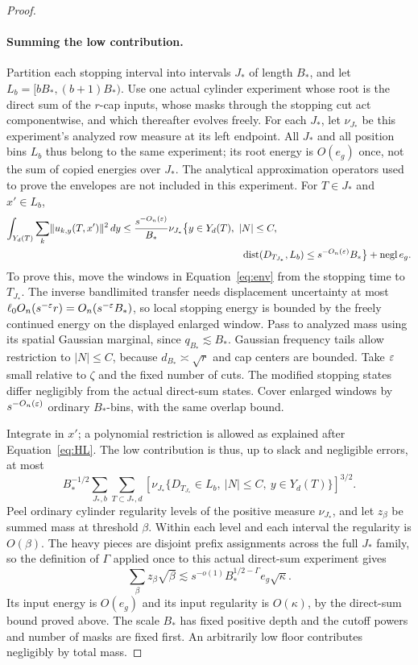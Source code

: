 \begin{proof}
\paragraph{Summing the low contribution.}
Partition each stopping interval into intervals $J_*$ of length $B_*$,
and let $L_b=[bB_*,(b+1)B_*)$. Use one actual cylinder experiment whose
root is the direct sum of the $r$-cap inputs, whose masks through the
stopping cut act componentwise, and which thereafter evolves freely.
For each $J_*$, let $\nu_{J_*}$ be this experiment's analyzed row measure
at its left endpoint. All $J_*$ and all position bins $L_b$ thus belong
to the same experiment; its root energy is $O(e_g)$ once, not the sum
of copied energies over $J_*$. The analytical
approximation operators used to prove the envelopes are not included
in this experiment. For $T\in J_*$ and $x'\in L_b$,
\[
\begin{split}
 \int_{Y_d(T)}\sum_k\norm{u_{k,y}(T,x')}^2\,dy
 \leq{}&\frac{s^{-O_n(\eps)}}{B_*}
 \nu_{J_*}\bigl\{y\in Y_d(T),\ |N|\leq C,\\
 &\hspace{38mm}\dist(D_{T_{J_*}},L_b)
                  \leq s^{-O_n(\eps)}B_*\bigr\}
 +\mathrm{negl}\,e_g.
\end{split}
\]
To prove this, move the windows in Equation~\eqref{eq:env} from the
stopping time to $T_{J_*}$. The inverse bandlimited transfer needs
displacement uncertainty at most
$\ell_0O_n(s^{-\varepsilon}r)=O_n(s^{-\varepsilon}B_*)$, so local stopping energy
is bounded by the freely continued energy on the displayed enlarged
window. Pass to analyzed mass using its spatial Gaussian marginal,
since $q_{B_*}\lesssim B_*$. Gaussian frequency tails allow restriction
to $|N|\leq C$, because $d_{B_*}\asymp\sqrt r$ and cap centers are
bounded. Take $\varepsilon$ small relative to $\zeta$ and the fixed number
of cuts. The modified stopping states differ negligibly from the
actual direct-sum states. Cover enlarged windows by
$s^{-O_n(\varepsilon)}$ ordinary $B_*$-bins, with the same overlap bound.

Integrate in $x'$; a polynomial restriction is allowed as explained
after Equation~\eqref{eq:HL}. The low contribution is thus, up to slack
and negligible errors, at most
\begin{equation}
 B_*^{-1/2}\sum_{J_*,b}\sum_{T\subset J_*,d}
 \left[\nu_{J_*}\{D_{T_{J_*}}\in L_b,\ |N|\leq C,
                                      \ y\in Y_d(T)\}\right]^{3/2}.
 \tag{low}\label{eq:low}
\end{equation}
Peel ordinary cylinder regularity levels of the positive measure
$\nu_{J_*}$, and let $z_\beta$ be summed mass at threshold $\beta$.
Within each level and each interval the regularity is $O(\beta)$.
The heavy pieces are disjoint prefix assignments across the full
$J_*$ family, so the definition of $\Gamma$ applied once to this
actual direct-sum experiment gives
\[
 \sum_\beta z_\beta\sqrt\beta
 \lesssim s^{-o(1)}B_*^{1/2-\Gamma}e_g\sqrt\kappa.
\]
Its input energy is $O(e_g)$ and its input regularity is $O(\kappa)$,
by the direct-sum bound proved above. The scale $B_*$ has fixed positive
depth and the cutoff powers and number of masks are fixed first.
An arbitrarily low floor contributes negligibly by total mass.


\end{proof}
